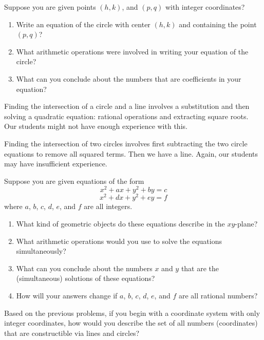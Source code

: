 \begin{prob}
Suppose you are given points $(h, k)$, and $(p, q)$ with integer coordinates?  
\begin{enumerate}
\item Write an equation of the circle with center $(h, k)$ and containing the point $(p, q)$?  
\item What arithmetic operations were involved in writing your equation of the circle?  
\item What can you conclude about the numbers that are coefficients in your equation?   
\end{enumerate}
\end{prob}

\begin{teachingnote}
Finding the intersection of a circle and a line involves a substitution and then solving a quadratic equation:  rational operations and extracting square roots.  Our students might not have enough experience with this.  

Finding the intersection of two circles involves first subtracting the two circle equations to remove all squared terms.  Then we have a  line.  Again, our students may have insufficient experience.  
\end{teachingnote}

\begin{prob}
Suppose you are given equations of the form 
$$x^2 + ax +y^2+by = c$$
$$x^2 + dx +y^2+ey = f$$
where $a$, $b$, $c$, $d$, $e$, and $f$ are all integers.  
\begin{enumerate}
\item What kind of geometric objects do these equations describe in the $xy$-plane?  
\item What arithmetic operations would you use to solve the equations simultaneously? 
\item What can you conclude about the numbers $x$ and $y$ that are the (simultaneous) solutions of these equations?  
\item How will your answers change if $a$, $b$, $c$, $d$, $e$, and $f$  are all rational numbers?  
\end{enumerate}
\end{prob}

\begin{prob}
Based on the previous problems, if you begin with a coordinate system with only integer coordinates, how would you describe the set of all numbers (coordinates) that are constructible via lines and circles?  
\end{prob}

